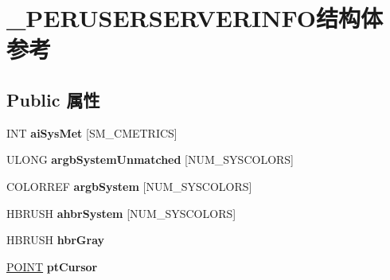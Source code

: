 \hypertarget{struct___p_e_r_u_s_e_r_s_e_r_v_e_r_i_n_f_o}{}\section{\+\_\+\+P\+E\+R\+U\+S\+E\+R\+S\+E\+R\+V\+E\+R\+I\+N\+F\+O结构体 参考}
\label{struct___p_e_r_u_s_e_r_s_e_r_v_e_r_i_n_f_o}
\subsection*{Public 属性}
\begin{DoxyCompactItemize}
\item 
\mbox{\label{struct___p_e_r_u_s_e_r_s_e_r_v_e_r_i_n_f_o_aa0cf5694f8b6440e27db9431a966e73a}} 
I\+NT {\bfseries ai\+Sys\+Met} \mbox{[}S\+M\+\_\+\+C\+M\+E\+T\+R\+I\+CS\mbox{]}
\item 
\mbox{\label{struct___p_e_r_u_s_e_r_s_e_r_v_e_r_i_n_f_o_a3f8f6b142f3f75b96ac191e8ce2276b6}} 
U\+L\+O\+NG {\bfseries argb\+System\+Unmatched} \mbox{[}N\+U\+M\+\_\+\+S\+Y\+S\+C\+O\+L\+O\+RS\mbox{]}
\item 
\mbox{\label{struct___p_e_r_u_s_e_r_s_e_r_v_e_r_i_n_f_o_a67d8d6c45888b8b8f409ba5b568a24f8}} 
C\+O\+L\+O\+R\+R\+EF {\bfseries argb\+System} \mbox{[}N\+U\+M\+\_\+\+S\+Y\+S\+C\+O\+L\+O\+RS\mbox{]}
\item 
\mbox{\label{struct___p_e_r_u_s_e_r_s_e_r_v_e_r_i_n_f_o_a440237bb9797f35dc3ef147b3bedb495}} 
H\+B\+R\+U\+SH {\bfseries ahbr\+System} \mbox{[}N\+U\+M\+\_\+\+S\+Y\+S\+C\+O\+L\+O\+RS\mbox{]}
\item 
\mbox{\label{struct___p_e_r_u_s_e_r_s_e_r_v_e_r_i_n_f_o_ad3b2e69693eca6aef2522cbc19bbd3a5}} 
H\+B\+R\+U\+SH {\bfseries hbr\+Gray}
\item 
\mbox{\label{struct___p_e_r_u_s_e_r_s_e_r_v_e_r_i_n_f_o_ace8457f19c00154ae133e0ad311dbc99}} 
\hyperlink{structtag_p_o_i_n_t}{P\+O\+I\+NT} {\bfseries pt\+Cursor}
\item 

\end{DoxyCompactItemize}
